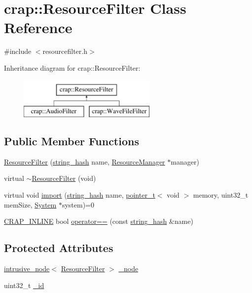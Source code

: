 \hypertarget{classcrap_1_1_resource_filter}{}\section{crap\+:\+:Resource\+Filter Class Reference}
\label{classcrap_1_1_resource_filter}


{\ttfamily \#include $<$resourcefilter.\+h$>$}

Inheritance diagram for crap\+:\+:Resource\+Filter\+:\begin{figure}[H]
\begin{center}
\leavevmode
\includegraphics[height=2.000000cm]{classcrap_1_1_resource_filter}
\end{center}
\end{figure}
\subsection*{Public Member Functions}
\begin{DoxyCompactItemize}
\item 
\hyperlink{classcrap_1_1_resource_filter_a351592e6aad1c7c8980b28d2c98971ac}{Resource\+Filter} (\hyperlink{classcrap_1_1string__hash}{string\+\_\+hash} name, \hyperlink{classcrap_1_1_resource_manager}{Resource\+Manager} $\ast$manager)
\item 
virtual \hyperlink{classcrap_1_1_resource_filter_aa3549608f0f033aa79230669e33b9637}{$\sim$\+Resource\+Filter} (void)
\item 
virtual void \hyperlink{classcrap_1_1_resource_filter_a6e2233cffaf44988fb651eb21f5d7824}{import} (\hyperlink{classcrap_1_1string__hash}{string\+\_\+hash} name, \hyperlink{structcrap_1_1pointer__t}{pointer\+\_\+t}$<$ void $>$ memory, uint32\+\_\+t mem\+Size, \hyperlink{classcrap_1_1_system}{System} $\ast$system)=0
\item 
\hyperlink{config__x86_8h_a5a40526b8d842e7ff731509998bb0f1c}{C\+R\+A\+P\+\_\+\+I\+N\+L\+I\+N\+E} bool \hyperlink{classcrap_1_1_resource_filter_a7e89a3e7e7ac7497eb679657def798c8}{operator==} (const \hyperlink{classcrap_1_1string__hash}{string\+\_\+hash} \&name)
\end{DoxyCompactItemize}
\subsection*{Protected Attributes}
\begin{DoxyCompactItemize}
\item 
\hyperlink{classcrap_1_1intrusive__node}{intrusive\+\_\+node}$<$ \hyperlink{classcrap_1_1_resource_filter}{Resource\+Filter} $>$ \hyperlink{classcrap_1_1_resource_filter_ae5724fd4f42bcd4ebe9e84ac1c9caf1c}{\+\_\+node}
\item 
uint32\+\_\+t \hyperlink{classcrap_1_1_resource_filter_a6991e27ddd701e769e6218fe34c333a6}{\+\_\+id}
\end{DoxyCompactItemize}


